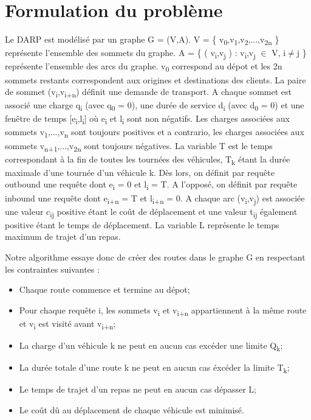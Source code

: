 \documentclass[11pt,a4paper]{report}
\begin{document}
\section*{Formulation du problème}
Le DARP est modélisé par un graphe G = (V,A). V = \{ v\textsubscript{0},v\textsubscript{1},v\textsubscript{2},...,v\textsubscript{2n} \} représente l'ensemble des sommets du graphe. 
A = \{ ( v\textsubscript{i},v\textsubscript{j} ) : v\textsubscript{i},v\textsubscript{j} $\in$ V, i$\neq $j \} représente l'ensemble des arcs du graphe.  v\textsubscript{0} correspond au dépot et les 2n sommets restants correspondent aux origines et destinations des clients. La paire de sommet (v\textsubscript{i},v\textsubscript{i+n}) définit une demande de transport.  
A chaque sommet est associé une charge q\textsubscript{i} (avec q\textsubscript{0} = 0), une durée de service d\textsubscript{i} (avec d\textsubscript{0} = 0)  et une fenêtre de temps [e\textsubscript{i},l\textsubscript{i}] où e\textsubscript{i} et l\textsubscript{i} sont non négatifs.
 Les charges associées aux sommets v\textsubscript{1},...,v\textsubscript{n} sont toujours positives et a contrario, les charges associées aux sommets v\textsubscript{n+1},...,v\textsubscript{2n} sont toujours négatives. 
 La variable T est le temps correspondant à la fin de toutes les tournées des véhicules, T\textsubscript{k} étant la durée maximale d'une tournée d'un véhicule k. Dès lors, on définit par requête outbound une requête dont e\textsubscript{i} = 0 et l\textsubscript{i} = T. A l'opposé, on définit par requête inbound une requête dont e\textsubscript{i+n} = T et l\textsubscript{i+n} = 0. 
A chaque arc (v\textsubscript{i},v\textsubscript{j}) est associée une valeur c\textsubscript{ij} positive étant le coût de déplacement et une valeur t\textsubscript{ij} également positive étant le temps de déplacement.
La variable L  représente le temps maximum de trajet d'un repas.
    
Notre algorithme essaye donc de créer des routes dans le graphe G en respectant les contraintes suivantes :
\begin{itemize}
\item Chaque route commence et termine au dépot;
\item Pour chaque requête i, les sommets v\textsubscript{i} et v\textsubscript{i+n} appartiennent à la même route et v\textsubscript{i} est visité avant v\textsubscript{i+n};
\item La charge d'un véhicule k ne peut en aucun cas excéder une limite Q\textsubscript{k};
\item La durée totale d'une route k ne peut en aucun cas éxcéder la limite T\textsubscript{k};
\item Le temps de trajet d'un repas ne peut en aucun cas dépasser L;
\item Le coût dû au déplacement de chaque véhicule est minimisé. 
\end{itemize}
\end{document}
